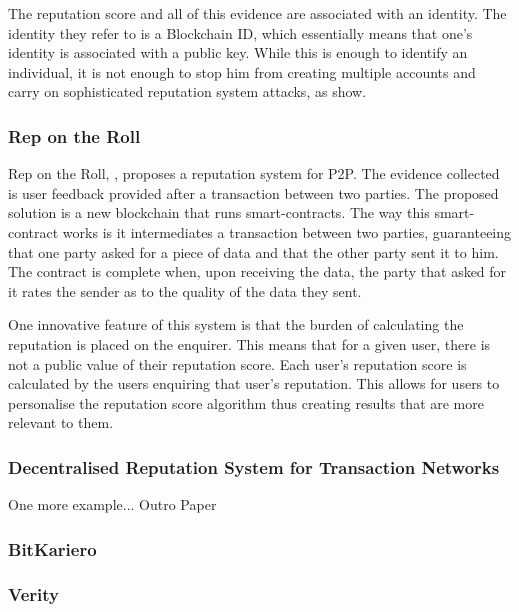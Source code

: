 \documentclass[llncsdoc]{llncs}
\begin{document}
The reputation score and all of this evidence are associated with an identity. The identity they refer to is a Blockchain ID, which essentially means that one's identity is associated with a public key. While this is enough to identify an individual, it is not enough to stop him from creating multiple accounts and carry on sophisticated reputation system attacks, as \cite{YanSun:2017jb,Ciccarelli:2011gf,Hoffman:2009gm} show. 

\subsubsection{Rep on the Roll}
Rep on the Roll, \cite{Dennis:2016um}, proposes a reputation system for P2P. The evidence collected is user feedback provided after a transaction between two parties. The proposed solution is a new blockchain that runs smart-contracts. The way this smart-contract works is it intermediates a transaction between two parties, guaranteeing that one party asked for a piece of data and that the other party sent it to him. The contract is complete when, upon receiving the data, the party that asked for it rates the sender as to the quality of the data they sent.

One innovative feature of this system is that the burden of calculating the reputation is placed on the enquirer. This means that for a given user, there is not a public value of their reputation score. Each user's reputation score is calculated by the users enquiring that user's reputation. This allows for users to personalise the reputation score algorithm thus creating results that are more relevant to them. 

\subsubsection{Decentralised Reputation System for Transaction Networks}
One more example... Outro Paper

\subsubsection{BitKariero}

\subsubsection{Verity}
\end{document}
